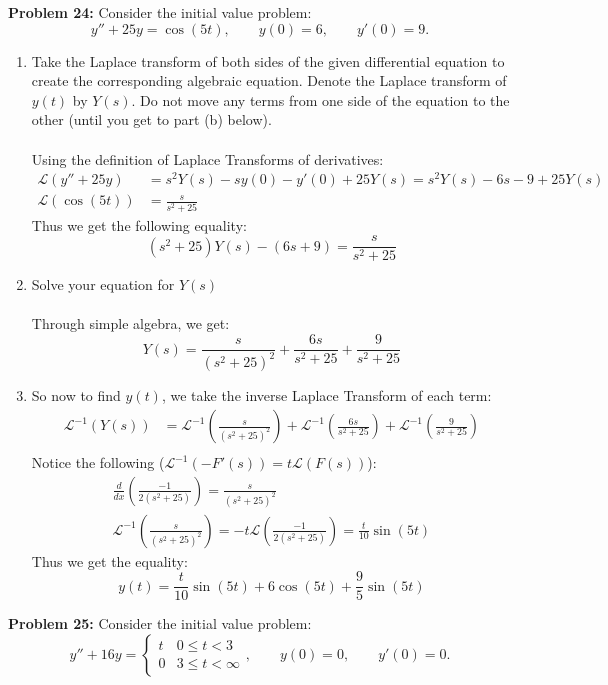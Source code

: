 \documentclass[12pt]{article}
\begin{document}
\newpage 

\noindent \textbf{Problem 24: }Consider the initial value problem:
$$
y'' + 25y = \cos(5t),
\qquad y(0) = 6, \qquad y'(0) = 9.
$$

\begin{enumerate}[label = (\alph*)]
	\item Take the Laplace transform of both sides of the given differential equation to create the corresponding algebraic equation. Denote the Laplace transform of $y(t)$ by $Y(s)$. Do not move any terms from one side of the equation to the other (until you get to part (b) below).
	\\ \\
	Using the definition of Laplace Transforms of derivatives:
	\begin{align*}
	\mathcal{L}(y'' + 25y) &= s^2Y(s) - sy(0) - y'(0) + 25Y(s) = s^2Y(s) - 6s - 9 + 25Y(s) \\
	\mathcal{L}(\cos(5t)) &= \frac{s}{s^2 + 25}
	\end{align*}
	Thus we get the following equality:
	$$
	(s^2 + 25)Y(s) - (6s + 9) = \frac{s}{s^2 + 25}
	$$
	\item Solve your equation for $Y(s)$
	\\ \\
	Through simple algebra, we get:
	$$
	Y(s) = \frac{s}{(s^2 + 25)^2} + \frac{6s}{s^2 + 25} + \frac{9}{s^2 + 25}
	$$
	\item So now to find $y(t)$, we take the inverse Laplace Transform of each term:
	\begin{align*}
	\mathcal{L}^{-1}(Y(s)) &= \mathcal{L}^{-1}\left(\frac{s}{(s^2 + 25)^2}\right) + \mathcal{L}^{-1}\left( \frac{6s}{s^2 + 25}\right) + \mathcal{L}^{-1}\left(\frac{9}{s^2 + 25}\right) \\
	\end{align*}
	Notice the following ($\mathcal{L}^{-1}(-F'(s)) = t\mathcal{L}(F(s))$):
		\begin{align*}
			\frac{d}{dx}\left(\frac{-1}{2(s^2 + 25)}\right) = \frac{s}{(s^2 + 25)^2} \\
			\mathcal{L}^{-1}\left(\frac{s}{(s^2 + 25)^2}\right) = -t\mathcal{L}\left(\frac{-1}{2(s^2 + 25)}\right) = \frac{t}{10}\sin(5t)
		\end{align*}
	Thus we get the equality:
		$$
		y(t) = \frac{t}{10}\sin(5t) + 6\cos(5t) + \frac{9}{5}\sin(5t)
		$$
\end{enumerate}

\newpage

\noindent \textbf{Problem 25: }Consider the initial value problem:
$$
y'' + 16y = 
\begin{cases}
t & 0 \leq t  < 3 \\
0 & 3 \leq t < \infty
\end{cases},
\qquad y(0) = 0, \qquad y'(0) = 0.
$$
\end{document}

